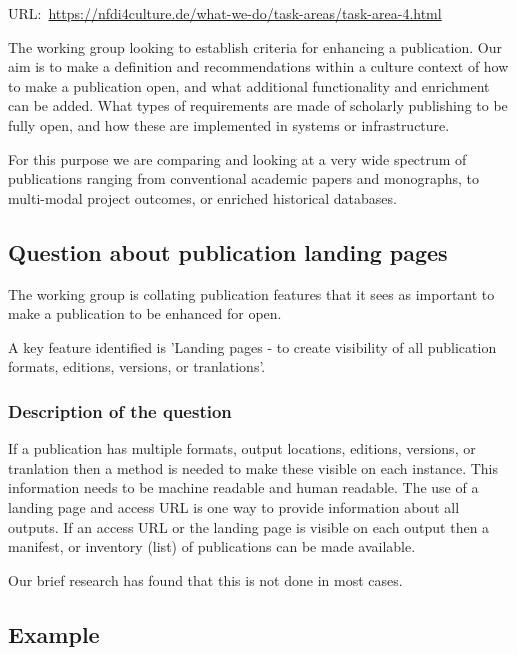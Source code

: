 \documentclass{article}
\begin{document}
URL: \href{https://nfdi4culture.de/what-we-do/task-areas/task-area-4.html}{https://nfdi4culture.de/what-we-do/task-areas/task-area-4.html}


The working group looking to establish criteria for enhancing a publication. Our aim is to make a definition and recommendations within a culture context of how to make a publication open, and what additional functionality and enrichment can be added. What types of requirements are made of scholarly publishing to be fully open, and how these are implemented in systems or infrastructure.


For this purpose we are comparing and looking at a very wide spectrum of publications ranging from conventional academic papers and monographs, to multi-modal project outcomes, or enriched historical databases.


\subsection{\textbf{Question about publication landing pages}}\label{H1966406}



The working group is collating publication features that it sees as important to make a publication to be enhanced for open.


A key feature identified is 'Landing pages - to create visibility of all publication formats, editions, versions, or tranlations'.


\subsubsection{\textbf{Description of the question}}\label{H3516035}



If a publication has multiple formats, output locations, editions, versions, or tranlation then a method is needed to make these visible on each instance. This information needs to be machine readable and human readable. The use of a landing page and access URL is one way to provide information about all outputs. If an access URL or the landing page is visible on each output then a manifest, or inventory (list) of publications can be made available.


Our brief research has found that this is not done in most cases.


\subsection{\textbf{Example}}\label{H4241469}
\end{document}
